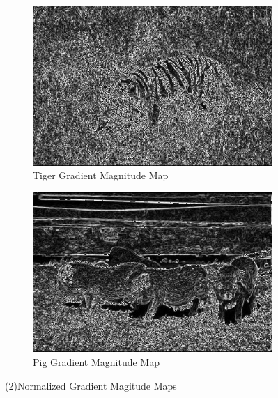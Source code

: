 \documentclass[12pt]{article}
\begin{document}
\begin{figure}[H]
	\centering  %
	\begin{subfigure}{0.45\textwidth}
		\centering
		\includegraphics[width=\textwidth]{Tiger1.jpg}
		\caption{Tiger Gradient Magnitude Map}
		\label{tiger.gradien}
	\end{subfigure}
	\begin{subfigure}{0.45\textwidth}
		\centering
		\includegraphics[width=\textwidth]{Pig1.jpg}
		\caption{Pig Gradient Magnitude Map}
		\label{pig.gradient}
	\end{subfigure}
	\caption{(2)Normalized Gradient Magitude Maps}
	\label{p1a2}
\end{figure}
\end{document}

